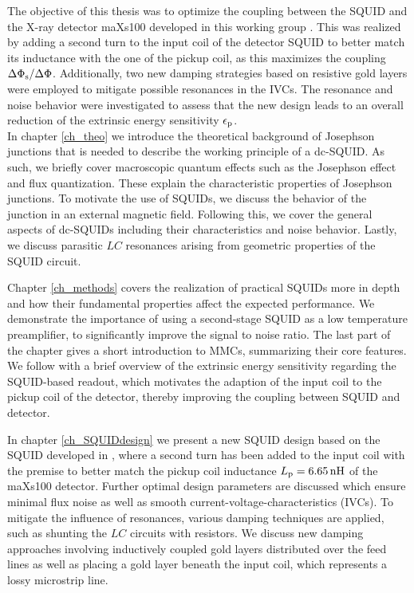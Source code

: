 The objective of this thesis was to optimize the coupling between the SQUID and the X-ray detector maXs100 developed in this working group \cite{Allgeier2024}. This was realized by adding a second turn to the input coil of the detector SQUID to better match its inductance with the one of the pickup coil, as this maximizes the coupling  $\Delta\Phi_{\rm s}/\Delta\Phi$. Additionally, two new damping strategies based on resistive gold layers were employed to mitigate possible resonances in the IVCs. The resonance and noise behavior were investigated to assess that the new design leads to an overall reduction of the extrinsic energy sensitivity $\epsilon_{\rm p}$. \\

In chapter \ref{ch_theo} we introduce the theoretical background of Josephson junctions that is needed to describe the working principle of a dc-SQUID. As such, we briefly cover macroscopic quantum effects such as the Josephson effect and flux quantization. These explain the characteristic properties of Josephson junctions. To motivate the use of SQUIDs, we discuss the behavior of the junction in an external magnetic field. Following this, we cover the general aspects of dc-SQUIDs including their characteristics and noise behavior. Lastly, we discuss parasitic $LC$ resonances arising from geometric properties of the SQUID circuit.

Chapter \ref{ch_methods} covers the realization of practical SQUIDs more in depth and how their fundamental properties affect the expected performance. We demonstrate the importance of using a second-stage SQUID as a low temperature preamplifier, to significantly improve the signal to noise ratio. The last part of the chapter gives a short introduction to MMCs, summarizing their core features. We follow with a brief overview of the extrinsic energy sensitivity regarding the SQUID-based readout, which motivates the adaption of the input coil to the pickup coil of the detector, thereby improving the coupling between SQUID and detector.   

In chapter \ref{ch_SQUIDdesign} we present a new SQUID design based on the SQUID developed in \cite{Bauer2022}, where a second turn has been added to the input coil with the premise to better match the pickup coil inductance $L_{\rm p}=\qty{6.65}{\nH}$ of the maXs100 detector. Further optimal design parameters are discussed which ensure minimal flux noise as well as smooth current-voltage-characteristics (IVCs). To mitigate the influence of resonances, various damping techniques are applied, such as shunting the $LC$ circuits with resistors. We discuss new damping approaches involving inductively coupled gold layers distributed over the feed lines as well as placing a gold layer beneath the input coil, which represents a lossy microstrip line.  

